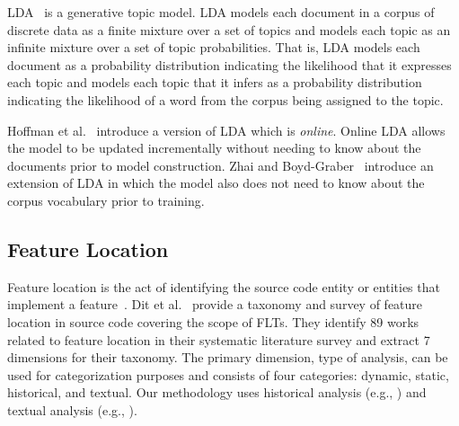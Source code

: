 LDA~\cite{Blei-etal:2003} is a generative topic model.
LDA models each document in a corpus of discrete data as a finite mixture over
a set of topics and models each topic as an infinite mixture over a set of
topic probabilities.  That is, LDA models each document as a probability
distribution indicating the likelihood that it expresses each topic and models
each topic that it infers as a probability distribution indicating the
likelihood of a word from the corpus being assigned to the topic.

Hoffman et al.~\cite{Hoffman-etal:2010} introduce a version of LDA which is
\emph{online}.  Online LDA allows the model to be updated incrementally without
needing to know about the documents prior to model construction.  Zhai and
Boyd-Graber~\cite{Zhai-Boyd-Graber:2013} introduce an extension of LDA in which
the model also does not need to know about the corpus vocabulary prior to
training.


\subsection{Feature Location}

Feature location is the act of identifying the source code entity or entities
that implement a feature~\cite{Rajlich-Wilde:2002}.
Dit et al.~\cite{Dit-etal:2011} provide a taxonomy and survey of feature
location in source code covering the scope of FLTs.  They identify 89 works
related to feature location in their systematic literature survey and extract
7 dimensions for their taxonomy.  The primary dimension, type of analysis, can
be used for categorization purposes and consists of four categories: dynamic,
static, historical, and textual.
Our methodology uses historical analysis (e.g., \cite{Cubranic-etal:2005}) and textual analysis (e.g., \cite{Marcus-etal:2004}).


